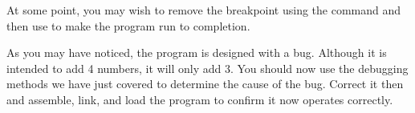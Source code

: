 At some point, you may wish to remove the breakpoint using the
 command and then use  to make the program run to
completion.

As you may have noticed, the program is designed with a bug. Although
it is intended to add 4 numbers, it will only add 3. You should now use
the debugging methods we have just covered to determine the cause of the
bug. Correct it then and assemble, link, and load the program to confirm
it now operates correctly.
